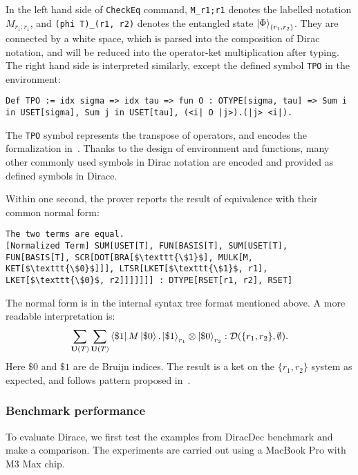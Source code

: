 \documentclass[runningheads]{llncs}
\begin{document}
In the left hand side of \texttt{\textcolor{NavyBlue}{CheckEq}} command, \texttt{M\_r1;r1} denotes the labelled notation $M_{r_1; r_1}$, and \texttt{(phi T)\_(r1, r2)} denotes the entangled state $\ket{\Phi}_{(r_1, r_2)}$. They are connected by a white space, which is parsed into the composition of Dirac notation, and will be reduced into the operator-ket multiplication after typing. The right hand side is interpreted similarly, except the defined symbol \texttt{TPO} in the environment:

\begin{lstlisting}[style=dirace]
Def TPO := idx sigma => idx tau => fun O : OTYPE[sigma, tau] => Sum i in USET[sigma], Sum j in USET[tau], (<i| O |j>).(|j> <i|).
\end{lstlisting}

The \texttt{TPO} symbol represents the transpose of operators, and encodes the formalization in~. Thanks to the design of environment and functions, many other commonly used symbols in Dirac notation are encoded and provided as defined symbols in Dirace.

Within one second, the prover reports the result of equivalence with their common normal form:
    \begin{lstlisting}[style=dirace]
The two terms are equal.
[Normalized Term] SUM[USET[T], FUN[BASIS[T], SUM[USET[T], FUN[BASIS[T], SCR[DOT[BRA[$\texttt{\$1}$], MULK[M, KET[$\texttt{\$0}$]]], LTSR[LKET[$\texttt{\$1}$, r1], LKET[$\texttt{\$0}$, r2]]]]]]] : DTYPE[RSET[r1, r2], RSET]
    \end{lstlisting}

The normal form is in the internal syntax tree format mentioned above. A more readable interpretation is:
\[
\sum_{\mathbf{U}(T)} \sum_{\mathbf{U}(T)} \bra{\$1}M\ket{\$ 0} . \ket{\$1}_{r_1} \otimes \ket{\$0}_{r_2} : \mathcal{D}(\{r_1, r_2\}, \emptyset).
\]
Here $\$0$ and $\$1$ are de Bruijn indices. The result is a ket on the $\{r_1, r_2\}$ system as expected, and follows pattern proposed in~.




\subsubsection{Benchmark performance}

To evaluate Dirace, we first test the examples from DiracDec benchmark and make a comparison.
The experiments are carried out using a MacBook Pro with M3 Max chip.
\end{document}
